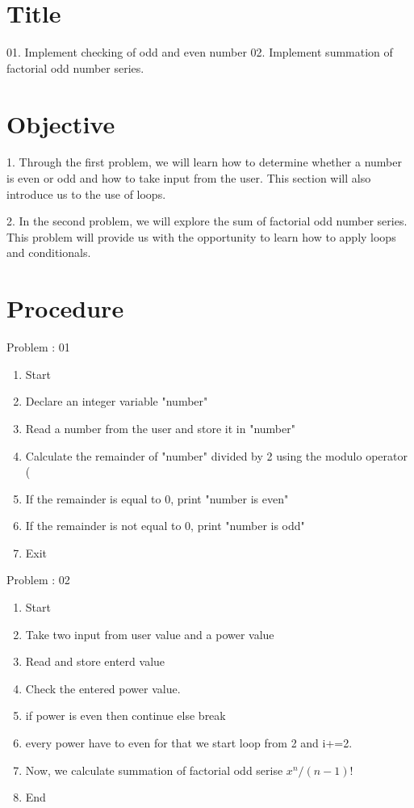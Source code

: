 \documentclass{article}
\begin{document}
\clearpage

\section{Title}
\Large 01. Implement checking of odd and even number \newline
\Large 02. Implement summation of factorial odd number series.
\section{Objective}
\large 1. Through the first problem, we will learn how to determine whether a number is even or odd and how to take input from the user. This section will also introduce us to the use of loops.

\large 2. In the second problem, we will explore the sum of factorial odd number series. This problem will provide us with the opportunity to learn how to apply loops and conditionals.

\section{Procedure}
\Large Problem : 01
\begin{enumerate}
\item Start
\item  Declare an integer variable "number"
\item  Read a number from the user and store it in "number"
\item  Calculate the remainder of "number" divided by 2 using the modulo operator (%
\item  If the remainder is equal to 0, print "number is even"
\item  If the remainder is not equal to 0, print "number is odd"
\item  Exit

\end{enumerate}
\vspace{0.5cm}
\Large Problem : 02
\begin{enumerate}
    \item Start
    \item Take two input from user value and a power value
    \item Read and store enterd value
    \item Check the entered power value.
    \item if power is even then continue else break
    \item every power have to even for that we start loop from 2 and i+=2.
    \item Now, we calculate summation of factorial odd serise  $x^n / (n-1)!$
    \item End
\end{enumerate}
\end{document}
